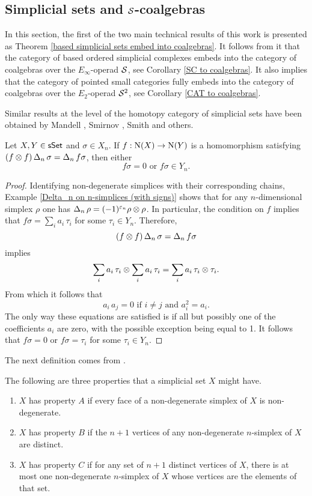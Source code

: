\documentclass[thesis.tex]{subfiles}
\begin{document}
\subsection{Simplicial sets and $\S$-coalgebras}

In this section, the first of the two main technical results of this work is presented as Theorem \ref{based simplicial sets embed into coalgebras}. It follows from it that the category of based ordered simplicial complexes embeds into the category of coalgebras over the $E_\infty$-operad $\S$, see Corollary \ref{SC to coalgebras}. It also implies that the category of pointed small categories fully embeds into the category of coalgebras over the $E_2$-operad $\S^2$, see Corollary \ref{CAT to coalgebras}.

Similar results at the level of the homotopy category of simplicial sets have been obtained by Mandell \cite{Man06}, Smirnov \cite{Smi98}, Smith \cite{Smi15} and others.

\begin{lemma} \label{simplices to simplices}
Let $X,Y\in\sSet$ and $\sigma\in X_n$. If $f:\chains(X)\to\chains(Y)$ is a homomorphism satisfying $(f\tensor f)\cop_n\sigma=\cop_n f\sigma$, then either $$f\sigma=0\text{\ \ or\ \ }f\sigma\in Y_n.$$
\begin{proof}
Identifying non-degenerate simplices with their corresponding chains, Example \ref{Delta_n on n-simplices (with signs)} shows that for any $n$-dimensional simplex $\rho$ one has $\cop_n\rho=(-1)^{\varepsilon_n}\rho\tensor\rho$. In particular, the condition on $f$ implies that $f\sigma=\sum_ia_i\,\tau_i$ for some $\tau_i\in Y_n$. Therefore,
$$(f\tensor f)\cop_n\sigma=\cop_n f\sigma$$ implies $$\sum_ia_i\,\tau_i\tensor \sum_ia_i\,\tau_i = \sum_ia_i\,\tau_i\tensor\tau_i. $$
From which it follows that
$$a_i\,a_j=0 \text{ if } i\neq j \text{ and } a_i^2=a_i.$$
The only way these equations are satisfied is if all but possibly one of the coefficients $a_i$ are zero, with the possible exception being equal to 1. It follows that $f\sigma=0$ or $f\sigma=\tau_i$ for some $\tau_i\in Y_n$.
\end{proof}
\end{lemma}

The next definition comes from \cite{May03}.

\begin{definition} The following are three properties that a simplicial set $X$ might have.
\begin{enumerate}[$(A)$]
\item $X$ has property $A$ if every
face of a non-degenerate simplex of $X$ is non-degenerate.
\item $X$ has property $B$ if the $n+1$ vertices
of any non-degenerate $n$-simplex of $X$ are distinct.
\item $X$ has property $C$ if for any set of
$n+1$ distinct vertices of $X$, there is at most one non-degenerate $n$-simplex of
$X$ whose vertices are the elements of that set.
\end{enumerate}
\end{definition}
\end{document}
